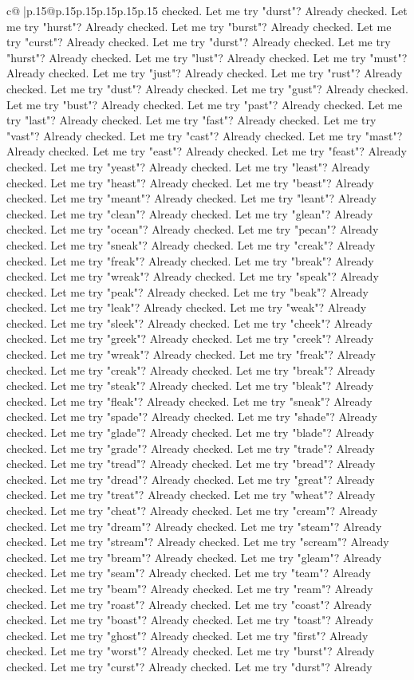 \documentclass{article}
\begin{document}
{\begin{supertabular}{c@{$\;$}|p{.15\linewidth}@{}p{.15\linewidth}p{.15\linewidth}p{.15\linewidth}p{.15\linewidth}p{.15\linewidth}}
{{{checked. Let me try "durst"? Already checked. Let me try "hurst"? Already checked. Let me try "burst"? Already checked. Let me try "curst"? Already checked. Let me try "durst"? Already checked. Let me try "hurst"? Already checked. Let me try "lust"? Already checked. Let me try "must"? Already checked. Let me try "just"? Already checked. Let me try "rust"? Already checked. Let me try "dust"? Already checked. Let me try "gust"? Already checked. Let me try "bust"? Already checked. Let me try "past"? Already checked. Let me try "last"? Already checked. Let me try "fast"? Already checked. Let me try "vast"? Already checked. Let me try "cast"? Already checked. Let me try "mast"? Already checked. Let me try "east"? Already checked. Let me try "feast"? Already checked. Let me try "yeast"? Already checked. Let me try "least"? Already checked. Let me try "heast"? Already checked. Let me try "beast"? Already checked. Let me try "meant"? Already checked. Let me try "leant"? Already checked. Let me try "clean"? Already checked. Let me try "glean"? Already checked. Let me try "ocean"? Already checked. Let me try "pecan"? Already checked. Let me try "sneak"? Already checked. Let me try "creak"? Already checked. Let me try "freak"? Already checked. Let me try "break"? Already checked. Let me try "wreak"? Already checked. Let me try "speak"? Already checked. Let me try "peak"? Already checked. Let me try "beak"? Already checked. Let me try "leak"? Already checked. Let me try "weak"? Already checked. Let me try "sleek"? Already checked. Let me try "cheek"? Already checked. Let me try "greek"? Already checked. Let me try "creek"? Already checked. Let me try "wreak"? Already checked. Let me try "freak"? Already checked. Let me try "creak"? Already checked. Let me try "break"? Already checked. Let me try "steak"? Already checked. Let me try "bleak"? Already checked. Let me try "fleak"? Already checked. Let me try "sneak"? Already checked. Let me try "spade"? Already checked. Let me try "shade"? Already checked. Let me try "glade"? Already checked. Let me try "blade"? Already checked. Let me try "grade"? Already checked. Let me try "trade"? Already checked. Let me try "tread"? Already checked. Let me try "bread"? Already checked. Let me try "dread"? Already checked. Let me try "great"? Already checked. Let me try "treat"? Already checked. Let me try "wheat"? Already checked. Let me try "cheat"? Already checked. Let me try "cream"? Already checked. Let me try "dream"? Already checked. Let me try "steam"? Already checked. Let me try "stream"? Already checked. Let me try "scream"? Already checked. Let me try "bream"? Already checked. Let me try "gleam"? Already checked. Let me try "seam"? Already checked. Let me try "team"? Already checked. Let me try "beam"? Already checked. Let me try "ream"? Already checked. Let me try "roast"? Already checked. Let me try "coast"? Already checked. Let me try "boast"? Already checked. Let me try "toast"? Already checked. Let me try "ghost"? Already checked. Let me try "first"? Already checked. Let me try "worst"? Already checked. Let me try "burst"? Already checked. Let me try "curst"? Already checked. Let me try "durst"? Already }}}
\end{supertabular}}
\end{document}
